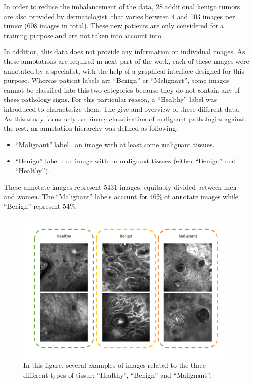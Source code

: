 \documentclass[journal,article,submit,moreauthors,pdftex, applsci]{Definitions/mdpi}
\begin{document}
In order to reduce the imbalancement of the data, 28 additional benign tumors are also provided by dermatologist, that varies between 4 and 103 images per tumor (608 images in total). These new patients are only considered for a training purpose and are not taken into account into .\par
In addition, this data does not provide any information on individual images. As these annotations are required in next part of the work, each of these images were annotated by a specialist, with the help of a graphical interface designed for this purpose. Whereas patient labels are “Benign” or “Malignant”, some images cannot be classified into this two categories because they do not contain any of these pathology signs. For this particular reason, a “Healthy” label was introduced to characterize them. The  give and overview of these different data. As this study focus only on binary classification of malignant pathologies against the rest, an annotation hierarchy was defined as following:
\begin{itemize}  
\item “Malignant” label : an image with at least some malignant tissues. 
\item “Benign” label : an image with no malignant tissues (either “Benign” and “Healthy”). 
\end{itemize}
These annotate images represent 5431 images, equitably divided between men and women. The “Malignant” labels account for 46\% of annotate images while “Benign” represent 54\%.\par
\begin{figure}[h]
    \begin{center}
        \includegraphics[width=\linewidth]{Figures/Data.pdf}
        \caption{In this figure, several examples of images related to the three different types of tissue: “Healthy”, “Benign” and “Malignant”.}
        \label{fig:data}
    \end{center} 
\end{figure}\par
\end{document}
